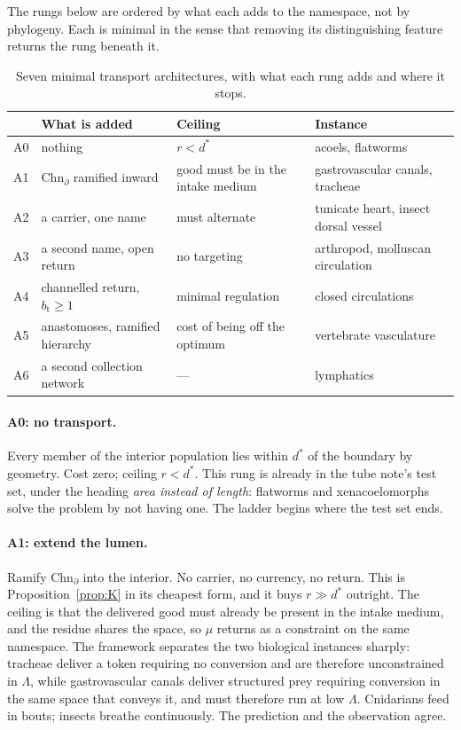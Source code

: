 \documentclass[11pt]{article}
\theoremstyle{plain}
\theoremstyle{definition}
\newcommand{\Chn}{\mathrm{Chn}}
\newcommand{\bt}{b_{\mathrm{t}}}
\begin{document}
The rungs below are ordered by what each adds to the namespace, not by phylogeny. Each is minimal in
the sense that removing its distinguishing feature returns the rung beneath it.

\begin{table}[t]
\centering
\footnotesize
\begin{tabular}{@{}>{\raggedright\arraybackslash}p{}>{\raggedright\arraybackslash}p{}>{\raggedright\arraybackslash}p{}>{\raggedright\arraybackslash}p{}@{}}
\toprule
& \textbf{What is added} & \textbf{Ceiling} & \textbf{Instance} \\
\midrule
A0 & nothing & $r < d^{*}$ & acoels, flatworms \\
A1 & $\Chn_{\partial}$ ramified inward & good must be in the intake medium & gastrovascular canals, tracheae \\[.2em]
A2 & a carrier, one name & must alternate & tunicate heart, insect dorsal vessel \\
A3 & a second name, open return & no targeting & arthropod, molluscan circulation \\
A4 & channelled return, $\bt \geq 1$ & minimal regulation & closed circulations \\
A5 & anastomoses, ramified hierarchy & cost of being off the optimum & vertebrate vasculature \\
A6 & a second collection network & --- & lymphatics \\
\bottomrule
\end{tabular}
\caption{Seven minimal transport architectures, with what each rung adds and where it stops.}
\label{tab:ladder}
\end{table}

\paragraph{A0: no transport.} Every member of the interior population lies within $d^{*}$ of the
boundary by geometry. Cost zero; ceiling $r < d^{*}$. This rung is already in the tube note's test
set, under the heading \emph{area instead of length}: flatworms and xenacoelomorphs solve the problem
by not having one. The ladder begins where the test set ends.

\paragraph{A1: extend the lumen.} Ramify $\Chn_{\partial}$ into the interior. No carrier, no currency,
no return. This is Proposition~\ref{prop:K} in its cheapest form, and it buys $r \gg d^{*}$ outright.
The ceiling is that the delivered good must already be present in the intake medium, and the residue
shares the space, so $\mu$ returns as a constraint on the same namespace. The framework separates the
two biological instances sharply: tracheae deliver a token requiring no conversion and are therefore
unconstrained in $\Lambda$, while gastrovascular canals deliver structured prey requiring conversion
in the same space that conveys it, and must therefore run at low $\Lambda$. Cnidarians feed in bouts;
insects breathe continuously. The prediction and the observation agree.
\end{document}

